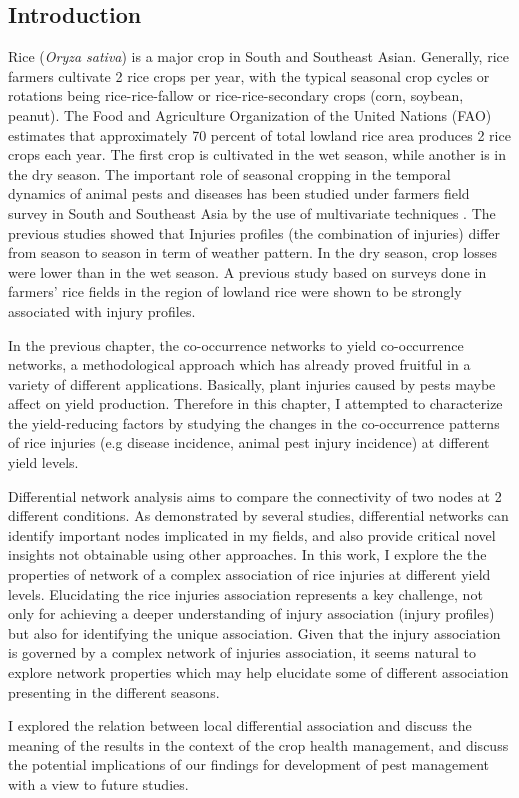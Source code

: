 \subsection{Introduction}

Rice (\textit{Oryza sativa}) is a major crop in South and Southeast Asian. Generally, rice farmers cultivate 2 rice crops per year, with the typical seasonal crop cycles or rotations being rice-rice-fallow or rice-rice-secondary crops (corn, soybean, peanut). The Food and Agriculture Organization of the United Nations (FAO) estimates that approximately 70 percent of total lowland rice area produces 2 rice crops each year. The first crop is cultivated in the wet season, while another is in the dry season. The important role of seasonal cropping in the temporal dynamics of animal pests and diseases has been studied under farmers field survey in South and Southeast Asia by the use of multivariate techniques \citet{Savary_2000_Characterization, Willocquet_2008_Simulating}. The previous studies showed that Injuries profiles (the combination of injuries) differ from season to season in term of weather pattern. In the dry season, crop losses were lower than in the wet season. A previous study based on surveys done in farmers’ rice fields in the region of lowland rice were shown to be strongly associated with injury profiles.

In the previous chapter, the co-occurrence networks to yield co-occurrence networks, a methodological approach which has already proved fruitful in a variety of different applications. Basically, plant injuries caused by pests maybe affect on yield production. Therefore in this chapter, I attempted to characterize the yield-reducing factors by studying the changes in the co-occurrence patterns of rice injuries (e.g disease incidence, animal pest injury incidence) at different yield levels.
 
Differential network analysis aims to compare the connectivity of two nodes at 2 different conditions. As demonstrated by several studies, differential networks can identify important nodes implicated in my fields, and also provide critical novel insights not obtainable using other approaches. In this work, I explore the the properties of network of a complex association of rice injuries at different yield levels. Elucidating the rice injuries association represents a key challenge, not only for achieving a deeper understanding of injury association (injury profiles) but also for identifying the unique association. Given that the injury association is governed by a complex network of injuries association, it seems natural to explore network properties which may help elucidate some of different association presenting in the different seasons.

I explored the relation between local differential association and discuss the meaning of the results in the context of the crop health management, and discuss the potential implications of our findings for development of pest management with a view to future studies.




